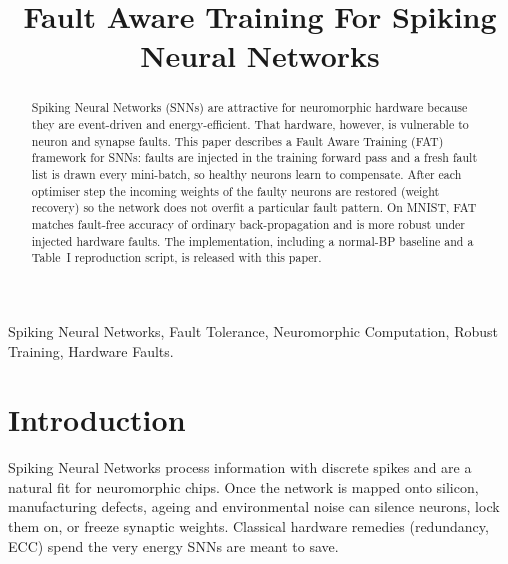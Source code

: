\documentclass[conference]{IEEEtran}
\begin{document}
\title{Fault Aware Training For Spiking Neural Networks}

\author{
\and
{}
}

\maketitle

\begin{abstract}
Spiking Neural Networks (SNNs) are attractive for neuromorphic hardware
because they are event-driven and energy-efficient. That hardware, however,
is vulnerable to neuron and synapse faults. This paper describes a Fault
Aware Training (FAT) framework for SNNs: faults are injected in the
training forward pass and a fresh fault list is drawn every mini-batch, so
healthy neurons learn to compensate. After each optimiser step the incoming
weights of the faulty neurons are restored (weight recovery) so the network
does not overfit a particular fault pattern. On MNIST, FAT matches
fault-free accuracy of ordinary back-propagation and is more robust under
injected hardware faults. The implementation, including a normal-BP
baseline and a Table~I reproduction script, is released with this paper.
\end{abstract}

\begin{IEEEkeywords}
Spiking Neural Networks, Fault Tolerance, Neuromorphic Computation,
Robust Training, Hardware Faults.
\end{IEEEkeywords}

\section{Introduction}

Spiking Neural Networks process information with discrete spikes and are a
natural fit for neuromorphic chips. Once the network is mapped onto
silicon, manufacturing defects, ageing and environmental noise can silence
neurons, lock them on, or freeze synaptic weights. Classical hardware
remedies (redundancy, ECC) spend the very energy SNNs are meant to save.
\end{document}
